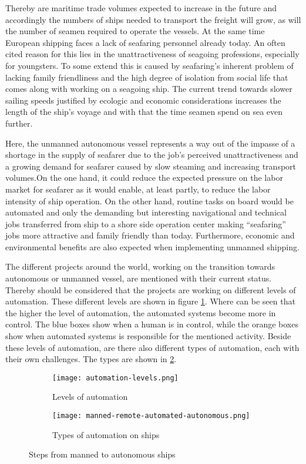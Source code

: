 Thereby are maritime trade volumes expected to increase in the future and accordingly the numbers of ships needed to transport the freight will grow, as will the number of seamen required to operate the vessels. At the same time European shipping faces a lack of seafaring personnel already today. An often cited reason for this lies in the unattractiveness of seagoing professions, especially for youngsters. To some extend this is caused by seafaring’s inherent problem of lacking family friendliness and the high degree of isolation from social life that comes along with working on a seagoing ship. The current trend towards slower sailing speeds justified by ecologic and economic considerations increases the length of the ship’s voyage and with that the time seamen spend on sea even further.

Here, the unmanned autonomous vessel represents a way out of the impasse of a shortage in the supply of seafarer due to the job’s perceived unattractiveness and a growing demand for seafarer caused by slow steaming and increasing transport volumes.On the one hand, it could reduce the expected pressure on the labor market for seafarer as it would enable, at least partly, to reduce the labor intensity of ship operation. On the other hand, routine tasks on board would be automated and only the demanding but interesting navigational and technical jobs transferred from ship to a shore side operation center making “seafaring” jobs more attractive and family friendly than today. Furthermore, economic and environmental benefits are also expected when implementing unmanned shipping. \cite{MUNIN2016}

The different projects around the world, working on the transition towards autonomous or unmanned vessel, are mentioned with their current status. Thereby should be considered that the projects are working on different levels of automation. These different levels are shown in figure \ref{fig:automation-levels}. Where can be seen that the higher the level of automation, the automated systems become more in control. The blue boxes show when a human is in control, while the orange boxes show when automated systems is responsible for the mentioned activity. 
Beside these levels of automation, are there also different types of automation, each with their own challenges. The types are shown in \ref{fig:manned-remote-autonomous}.

\begin{figure}[hb]
	\begin{subfigure}[b]{0.55\linewidth}
		\centering
		\texttt{[image: automation-levels.png]}
		\caption{Levels of automation}
		\label{fig:automation-levels}
	\end{subfigure} 
	\begin{subfigure}[b]{0.4\linewidth}
		\centering
		\texttt{[image: manned-remote-automated-autonomous.png]}
		\caption{Types of automation on ships}
		\label{fig:manned-remote-autonomous}
	\end{subfigure}
	\caption{Steps from manned to autonomous ships}
	\label{fig:automation} 
\end{figure}


